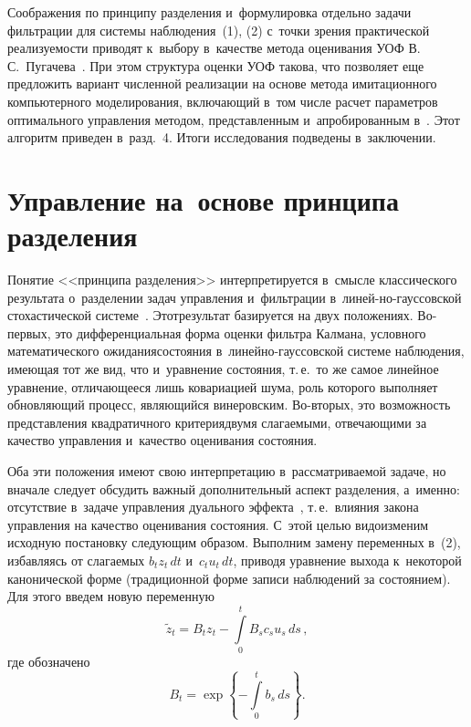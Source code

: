 \begin{multicols}{2}
     Соображения по принципу разделения и~формулировка отдельно 
задачи фильтрации для системы наблюдения~(1), (2) с~точки зрения 
практической реализуемости приводят к~выбору в~качестве метода 
оценивания УОФ 
В.\,С.~Пугачева~\cite{8-bos}. При этом структура оценки УОФ 
такова, что позволяет еще предложить 
вариант численной реализации на основе метода имитационного 
компьютерного моделирования, вклю\-ча\-ющий в~том чис\-ле расчет 
параметров оптимального управ\-ле\-ния методом, представленным 
и~апробированным в~\cite{4-bos}. Этот алгоритм приведен в~разд.~4. Итоги 
исследования подведены в~заключении.

\section{Управление на~основе принципа разделения}
     
     Понятие <<принципа разделения>> интерпрети\-руется в~смысле 
классического результата о~разделении задач управления и~фильтрации 
в~линей-\linebreak но-гауссовской стохастической системе~\cite{9-bos}. Этот\linebreak результат 
базируется на двух положениях. Во-пер\-вых, это дифференциальная форма 
оценки фильт\-ра Калмана, условного математического ожидания\linebreak состояния 
в~ли\-ней\-но-гаус\-сов\-ской системе наблюдения, имеющая тот же вид, что 
и~уравнение со\-стояния, т.\,е.\ то же самое линейное уравнение, 
отли\-чающееся лишь ковариацией шума, роль которого выполняет 
обновляющий процесс, явля\-ющий\-ся винеровским. Во-вто\-рых, это 
воз\-мож\-ность пред\-став\-ле\-ния квад\-ра\-тич\-но\-го критерия\linebreak двумя сла\-га\-емы\-ми, 
отвечающими за качество управ\-ле\-ния и~качество оценивания состояния.
     
     Оба эти положения имеют свою интерпретацию в~рассматриваемой 
задаче, но вначале следует обсудить важный дополнительный аспект 
разделения, а~именно: отсутствие в~задаче управления дуального 
эффекта~\cite{10-bos}, т.\,е.\ влияния закона управ\-ле\-ния на качество 
оценивания состояния. С~этой целью видоизменим исходную постановку 
сле\-ду\-ющим образом. Выполним замену переменных в~(2), избавляясь от 
слагаемых $b_tz_t\,dt$ и~$c_tu_t\,dt$, приводя уравнение выхода к~некоторой 
канонической форме (традиционной форме записи наблюдений за 
состоянием). Для этого введем новую переменную 
$$
\tilde{z}_t= B_tz_t- \int\limits_0^t B_s c_s u_s\,ds\,,
$$
 где обозначено 
$$
B_t= \exp \left\{-\int\limits_0^t b_s\,ds\right\}.
$$


\end{multicols}
